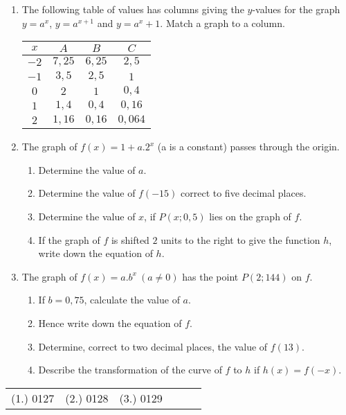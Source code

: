 \begin{eocexercises}{}
\begin{enumerate}
\item{The following table of values has columns giving the $y$-values for the graph $y = a^x$, $y = a ^{x+1}$  and $y = a^x + 1$.  Match a graph to a column.
\begin{center}
\begin{tabular}{|c|c|c|c|}\hline
$x$ & $A$ & $B$ & $C$\\\hline
$-2$ & $7,25$ & $6,25$ & $2,5$\\\hline
$-1$ & $3,5$ & $2,5$ & $1$\\\hline
$0$ & $2$ & $1$ & $0,4$\\\hline
$1$ & $1,4$ & $0,4$ & $0,16$\\\hline
$2$ & $1,16$ & $0,16$ & $0,064$\\\hline
\end{tabular}
\end{center}
}
\item{The graph of $f(x) = 1+ a.2^x$ (a is a constant) passes through the origin.}{
\begin{enumerate}
 \item{Determine the value of $a$.}
 \item{Determine the value of $f(-15)$ correct to five decimal places.}
 \item{Determine the value of $x$, if $P(x; 0,5)$ lies on the graph of $f$.}
 \item{If the graph of $f$ is shifted $2$ units to the right to give the function $h$, write down the equation of $h$.}
  \end{enumerate}}
\item{The graph of $f(x) = a.b^x ~(a \neq 0)$ has the point $P(2;144)$ on $f$.}{
\begin{enumerate}
\item{If $b = 0,75$, calculate the value of $a$.}
\item{Hence write down the equation of $f$.}
\item{Determine, correct to two decimal places, the value of $f(13)$.}
\item{Describe the transformation of the curve of $f$ to $h$ if $h(x) = f(-x)$.}
\end{enumerate}}
\end{enumerate}



\par \practiceinfo
\par \begin{tabular}[h]{cccccc}
(1.)	0127	&
(2.)	0128	&
(3.)	0129	&
\end{tabular}
\end{eocexercises}




